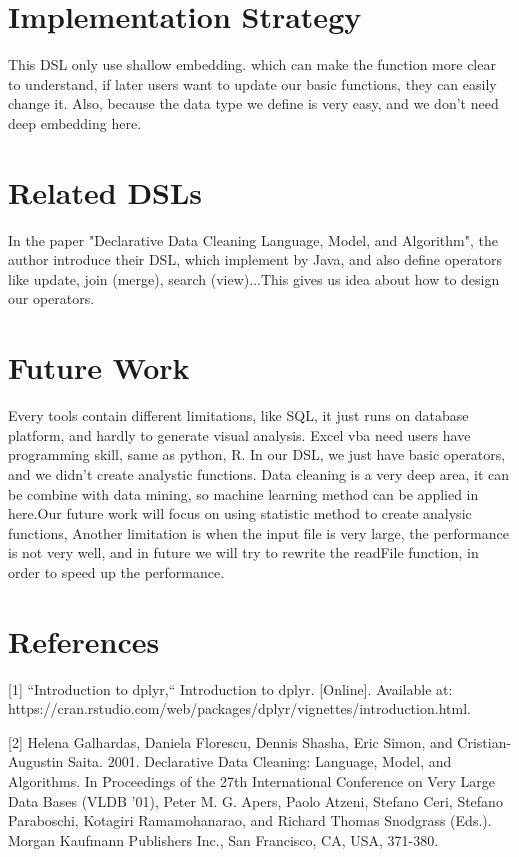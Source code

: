 \documentclass[11pt]{article}
\begin{document}
\begin{enumerate}[(1)]
\section{Implementation Strategy}

This DSL only use shallow embedding. which can make the function more clear to understand, if later users want to update our basic functions, they can easily change it. Also, because the data type we define is very easy, and we don't need deep embedding here. \\
\section{Related DSLs}
In the paper "Declarative Data Cleaning Language, Model, and Algorithm", the author introduce their DSL, which implement by Java, and also define operators like update, join (merge), search (view)...This gives us idea about how to design our operators.

\section{Future Work}


Every tools contain different limitations, like SQL, it just runs on database platform, and hardly to generate visual analysis. Excel vba need users have programming skill, same as python, R. In our DSL, we just have basic operators, and we didn’t create analystic functions. Data cleaning is a very deep area, it can be combine with data mining, so machine learning method can be applied in here.Our future work will focus on using statistic method to create analysic functions, Another limitation is when the input file is very large, the performance is not very well, and in future we will try to rewrite the readFile function, in order to speed up the performance. 





\end{enumerate}

\section*{References}


[1] ``Introduction to dplyr,`` Introduction to dplyr. [Online]. Available at: https://cran.rstudio.com/web/packages/dplyr/vignettes/introduction.html.

[2] Helena Galhardas, Daniela Florescu, Dennis Shasha, Eric Simon, and Cristian-Augustin Saita. 2001. Declarative Data Cleaning: Language, Model, and Algorithms. In Proceedings of the 27th International Conference on Very Large Data Bases (VLDB '01), Peter M. G. Apers, Paolo Atzeni, Stefano Ceri, Stefano Paraboschi, Kotagiri Ramamohanarao, and Richard Thomas Snodgrass (Eds.). Morgan Kaufmann Publishers Inc., San Francisco, CA, USA, 371-380.
\end{document}
